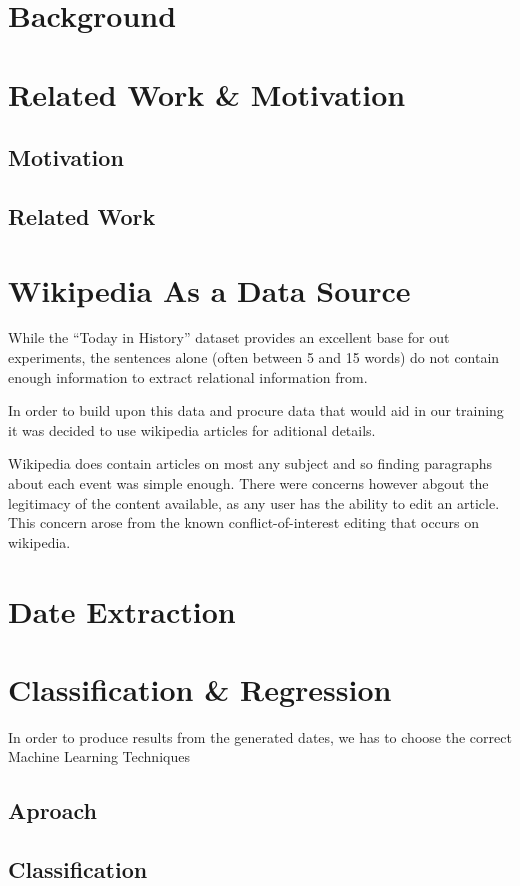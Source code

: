 \documentclass[bsc,frontabs,twoside,singlespacing,parskip,deptreport]{infthesis}     %
\begin{document}
\chapter{Background}

\chapter{Related Work \& Motivation}
\section{Motivation}
\section{Related Work}


\chapter{Wikipedia As a Data Source}
While the ``Today in History'' dataset provides an excellent
base for out experiments, the sentences alone
(often between 5 and 15 words) do not contain enough
information to extract relational information from.

In order to build upon this data and procure data that
would aid in our training it was decided to use wikipedia
articles for aditional details.

Wikipedia does contain articles on most any subject and so
finding paragraphs about each event was simple enough. There
were concerns however abgout the legitimacy of the content
available, as any user has the ability to edit an article.
This concern arose from the known conflict-of-interest editing
that occurs on wikipedia.
\chapter{Date Extraction}

\chapter{Classification \& Regression}
In order to produce results from the generated dates,
we has to choose the correct Machine Learning Techniques
\section{Aproach}

\section{Classification}
\end{document}
